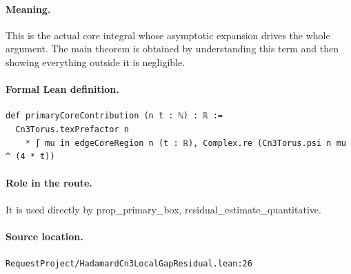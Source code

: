\medskip
\paragraph{Meaning.}
This is the actual core integral whose asymptotic expansion drives the whole argument. The main theorem is obtained by understanding this term and then showing everything outside it is negligible.
\paragraph{Formal Lean definition.}
\begin{verbatim}
def primaryCoreContribution (n t : ℕ) : ℝ :=
  Cn3Torus.texPrefactor n
    * ∫ mu in edgeCoreRegion n (t : ℝ), Complex.re (Cn3Torus.psi n mu ^ (4 * t))
\end{verbatim}
\paragraph{Role in the route.}
It is used directly by prop\_primary\_box, residual\_estimate\_quantitative.
\paragraph{Source location.}
\texttt{RequestProject/HadamardCn3LocalGapResidual.lean:26}
\medskip
